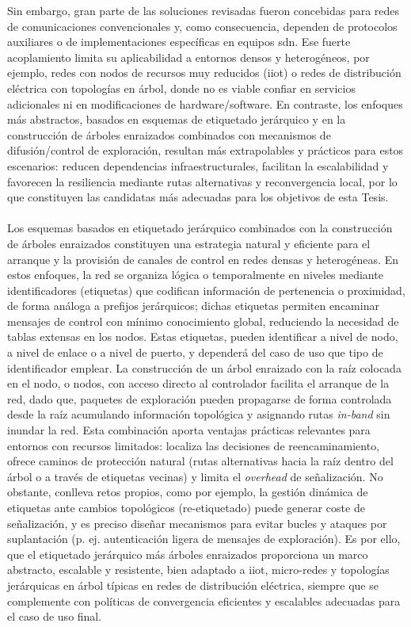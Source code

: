 Sin embargo, gran parte de las soluciones revisadas fueron concebidas para redes de comunicaciones convencionales y, como consecuencia, dependen de protocolos auxiliares o de implementaciones específicas en equipos \gls{sdn}. Ese fuerte acoplamiento limita su aplicabilidad a entornos densos y heterogéneos, por ejemplo, redes con nodos de recursos muy reducidos (\gls{iiot}) o redes de distribución eléctrica con topologías en árbol, donde no es viable confiar en servicios adicionales ni en modificaciones de hardware/software. En contraste, los enfoques más abstractos, basados en esquemas de etiquetado jerárquico y en la construcción de árboles enraizados combinados con mecanismos de difusión/control de exploración, resultan más extrapolables y prácticos para estos escenarios: reducen dependencias infraestructurales, facilitan la escalabilidad y favorecen la resiliencia mediante rutas alternativas y reconvergencia local, por lo que constituyen las candidatas más adecuadas para los objetivos de esta Tesis.\\
\\
Los esquemas basados en etiquetado jerárquico combinados con la construcción de árboles enraizados constituyen una estrategia natural y eficiente para el arranque y la provisión de canales de control en redes densas y heterogéneas. En estos enfoques, la red se organiza lógica o temporalmente en niveles mediante identificadores (etiquetas) que codifican información de pertenencia o proximidad, de forma análoga a prefijos jerárquicos; dichas etiquetas permiten encaminar mensajes de control con mínimo conocimiento global, reduciendo la necesidad de tablas extensas en los nodos. Estas etiquetas, pueden identificar a nivel de nodo, a nivel de enlace o a nivel de puerto, y dependerá del caso de uso que tipo de identificador emplear. La construcción de un árbol enraizado con la raíz colocada en el nodo, o nodos, con acceso directo al controlador facilita el arranque de la red, dado que, paquetes de exploración pueden propagarse de forma controlada desde la raíz acumulando información topológica y asignando rutas \textit{in-band} sin inundar la red. Esta combinación aporta ventajas prácticas relevantes para entornos con recursos limitados: localiza las decisiones de reencaminamiento, ofrece caminos de protección natural (rutas alternativas hacia la raíz dentro del árbol o a través de etiquetas vecinas) y limita el \textit{overhead} de señalización. No obstante, conlleva retos propios, como por ejemplo, la gestión dinámica de etiquetas ante cambios topológicos (re-etiquetado) puede generar coste de señalización, y es preciso diseñar mecanismos para evitar bucles y ataques por suplantación (p. ej. autenticación ligera de mensajes de exploración). Es por ello, que el etiquetado jerárquico más árboles enraizados proporciona un marco abstracto, escalable y resistente, bien adaptado a \gls{iiot}, micro-redes y topologías jerárquicas en árbol típicas en redes de distribución eléctrica, siempre que se complemente con políticas de convergencia eficientes y escalables adecuadas para el caso de uso final.\\
